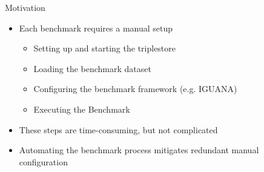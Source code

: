 \begin{frame}{Motivation}
	
	\begin{itemize}
		\item Each benchmark requires a manual setup
		\begin{itemize}
			\item Setting up and starting the triplestore
			\item Loading the benchmark dataset
			\item Configuring the benchmark framework (e.g. IGUANA)
			\item Executing the Benchmark
		\end{itemize}
		
		\item{These steps are time-consuming, but not complicated}
		\item{Automating the benchmark process mitigates redundant manual configuration}
		
	\end{itemize}
	
	
\end{frame}
